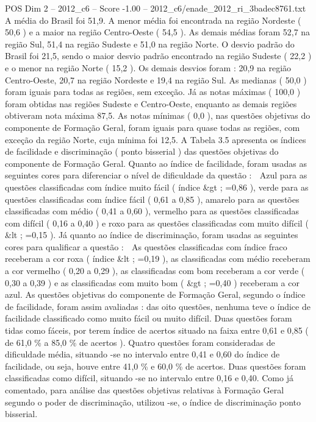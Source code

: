 \begin{textsample}{POS Dim 2 – 2012\_c6 – Score -1.00 – 2012\_c6/enade\_2012\_ri\_3badec8761.txt}
A média do Brasil foi 51,9.
A menor média foi encontrada na região Nordeste ( 50,6 ) e a maior na região Centro-Oeste ( 54,5 ).
As demais médias foram 52,7 na região Sul, 51,4 na região Sudeste e 51,0 na região Norte.
O desvio padrão do Brasil foi 21,5, sendo o maior desvio padrão encontrado na região Sudeste ( 22,2 ) e o menor na região Norte ( 15,2 ).
Os demais desvios foram : 20,9 na região Centro-Oeste, 20,7 na região Nordeste e 19,4 na região Sul.
As medianas ( 50,0 ) foram iguais para todas as regiões, sem exceção.
Já as notas máximas ( 100,0 ) foram obtidas nas regiões Sudeste e Centro-Oeste, enquanto as demais regiões obtiveram nota máxima 87,5.
As notas mínimas ( 0,0 ), nas questões objetivas do componente de Formação Geral, foram iguais para quase todas as regiões, com exceção da região Norte, cuja mínima foi 12,5.
A Tabela 3.5 apresenta os índices de facilidade e discriminação ( ponto bisserial ) das questões objetivas do componente de Formação Geral.
Quanto ao índice de facilidade, foram usadas as seguintes cores para diferenciar o nível de dificuldade da questão :  Azul para as questões classificadas com índice muito fácil ( índice \&gt ; =0,86 ), verde para as questões classificadas com índice fácil ( 0,61 a 0,85 ), amarelo para as questões classificadas com médio ( 0,41 a 0,60 ), vermelho para as questões classificadas com difícil ( 0,16 a 0,40 ) e roxo para as questões classificadas com muito difícil ( \&lt ; =0,15 ).
Já quanto ao índice de discriminação, foram usadas as seguintes cores para qualificar a questão :  As questões classificadas com índice fraco receberam a cor roxa ( índice \&lt ; =0,19 ), as classificadas com médio receberam a cor vermelho ( 0,20 a 0,29 ), as classificadas com bom receberam a cor verde ( 0,30 a 0,39 ) e as classificadas com muito bom ( \&gt ; =0,40 ) receberam a cor azul.
As questões objetivas do componente de Formação Geral, segundo o índice de facilidade, foram assim avaliadas : das oito questões, nenhuma teve o índice de facilidade classificado como muito fácil ou muito difícil.
Duas questões foram tidas como fáceis, por terem índice de acertos situado na faixa entre 0,61 e 0,85 ( de 61,0 \% a 85,0 \% de acertos ).
Quatro questões foram consideradas de dificuldade média, situando -se no intervalo entre 0,41 e 0,60 do índice de facilidade, ou seja, houve entre 41,0 \% e 60,0 \% de acertos.
Duas questões foram classificadas como difícil, situando -se no intervalo entre 0,16 e 0,40.
Como já comentado, para análise das questões objetivas relativas à Formação Geral segundo o poder de discriminação, utilizou -se, o índice de discriminação ponto bisserial.

\end{textsample}

